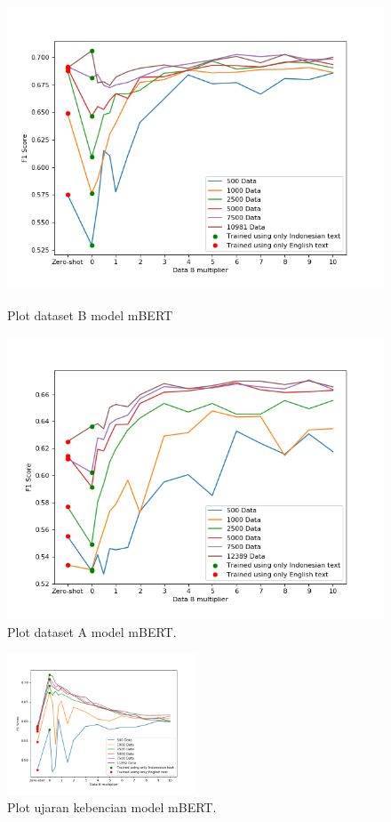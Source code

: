         \begin{figure}[ht]
              \includegraphics[width=\linewidth]{resources/plot-head-prosa-mbert.png}
              \caption{Plot dataset B model mBERT}\label{fig:plot_head_prosa_mbert}
            \endminipage\hfill
              \includegraphics[width=\linewidth]{resources/plot-head-trip-mbert.png}
              \caption{Plot dataset A model mBERT.}\label{fig:plot_head_trip_mbert}
            \endminipage
        \end{figure}

        \begin{figure}[ht]
            \centering
            \includegraphics[width=0.5\textwidth]{resources/plot-head-toxic-mbert.png}
            \caption{Plot ujaran kebencian model mBERT.}\label{fig:plot_head_toxic_mbert}
        \end{figure}

